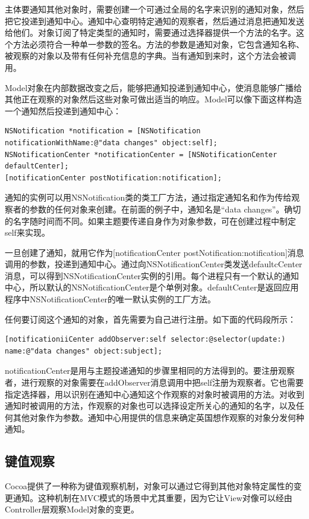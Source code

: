 \documentclass[a4paper, 12pt]{article}
\begin{document}
主体要通知其他对象时，需要创建一个可通过全局的名字来识别的通知对象，然后把它投递到通知中心。通知中心查明特定通知的观察者，然后通过消息把通知发送给他们。对象订阅了特定类型的通知时，需要通过选择器提供一个方法的名字。这个方法必须符合一种单一参数的签名。方法的参数是通知对象，它包含通知名称、被观察的对象以及带有任何补充信息的字典。当有通知到来时，这个方法会被调用。

Model对象在内部数据改变之后，能够把通知投递到通知中心，使消息能够广播给其他正在观察的对象然后这些对象可做出适当的响应。Model可以像下面这样构造一个通知然后投递到通知中心：
\begin{lstlisting}
NSNotification *notification = [NSNotification notificationWithName:@"data changes" object:self];
NSNotificationCenter *notificationCenter = [NSNotificationCenter defaultCenter];
[notificationCenter postNotification:notification];
\end{lstlisting}
通知的实例可以用NSNotification类的类工厂方法，通过指定通知名和作为传给观察者的参数的任何对象来创建。在前面的例子中，通知名是“data changes”。确切的名字随时间而不同。如果主题要传递自身作为对象参数，可在创建过程中制定self来实现。

一旦创建了通知，就用它作为[notificationCenter postNotification:notification]消息调用的参数，投递到通知中心。通过向NSNotificationCenter类发送defaultcCenter消息，可以得到NSNotificationCenter实例的引用。每个进程只有一个默认的通知中心，所以默认的NSNotificationCenter是个单例对象。defaultCenter是返回应用程序中NSNotificationCenter的唯一默认实例的工厂方法。

任何要订阅这个通知的对象，首先需要为自己进行注册。如下面的代码段所示：
\begin{lstlisting}
[notificationiiCenter addObserver:self selector:@selector(update:) name:@"data changes" object:subject];
\end{lstlisting}
notificationCenter是用与主题投递通知的步骤里相同的方法得到的。要注册观察者，进行观察的对象需要在addObserver消息调用中把self注册为观察者。它也需要指定选择器，用以识别在通知中心通知这个作观察的对象时被调用的方法。对收到通知时被调用的方法，作观察的对象也可以选择设定所关心的通知的名字，以及任何其他对象作为参数。通知中心用提供的信息来确定英国想作观察的对象分发何种通知。

\subsection{键值观察}
Cocoa提供了一种称为键值观察机制，对象可以通过它得到其他对象特定属性的变更通知。这种机制在MVC模式的场景中尤其重要，因为它让View对像可以经由Controller层观察Model对象的变更。
\end{document}
